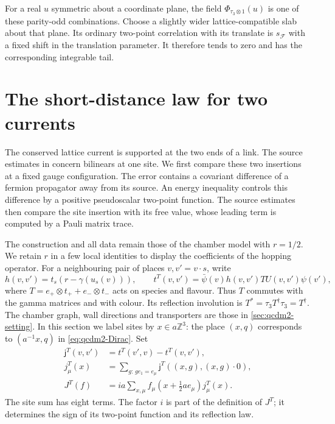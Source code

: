 \documentclass[11pt,letterpaper,reqno]{amsart}
\theoremstyle{definition}
\theoremstyle{remark}
\begin{document}
For a real $u$ symmetric about a coordinate plane,
the field $\Phi_{\tau_3\otimes1}(u)$ is one of
these parity-odd combinations. Choose a slightly
wider lattice-compatible slab about that plane.
Its ordinary two-point correlation with its
translate is $s_{\mathcal F}$ with a fixed shift
in the translation parameter. It therefore tends
to zero and has the corresponding integrable tail.

\section{The short-distance law for two currents}
\label{sec:qcdm2-currents}

The conserved lattice current is supported at the two ends of a
link.  The source estimates in \cite{QCDM1} concern bilinears at
one site.  We first compare these two insertions at a fixed gauge
configuration.  The error contains a covariant difference of a
fermion propagator away from its source.  An energy inequality
controls this difference by a positive pseudoscalar two-point
function.  The source estimates then compare the site insertion
with its free value, whose leading term is computed by a Pauli
matrix trace.

The construction and all data remain those of the chamber model
with $r=1/2$.  We retain $r$ in a few local identities to display
the coefficients of the hopping operator.  For a neighbouring
pair of places $v,v'=v\cdot s$, write
\[
 h(v,v')=t_s(r-\gamma(u_s(v))),\qquad
 t^T(v,v')=\bar\psi(v)h(v,v')T U(v,v')\psi(v'),
\]
where $T=e_+\otimes t_++e_-\otimes t_-$ acts on species and
flavour. Thus $T$ commutes with the gamma matrices and with colour.
Its reflection involution is
$T^*=\tau_3T^\dagger\tau_3=T^\dagger$.
The chamber graph, wall directions and transporters are those in
\cref{sec:qcdm2-setting}. In this section we label sites by
$x\in a\mathbb Z^3$: the place $(x,q)$ corresponds to
$(a^{-1}x,q)$ in \eqref{eq:qcdm2-Dirac}. Set
\begin{equation}\label{C-402-3}
 \begin{split}
 \mathsf j^T(v,v')&=t^T(v',v)-t^T(v,v'),\\
 j^T_\mu(x)&=\sum_{g:\,ge_1=e_\mu}
       \mathsf j^T((x,g),(x,g)\cdot0),\\
 J^T(f)&=ia\sum_{x,\mu}
       f_\mu(x+\tfrac12ae_\mu)j^T_\mu(x).
 \end{split}
\end{equation}
The site sum has eight terms.  The factor $i$ is part of the
definition of $J^T$; it determines the sign of its two-point
function and its reflection law.
\end{document}
